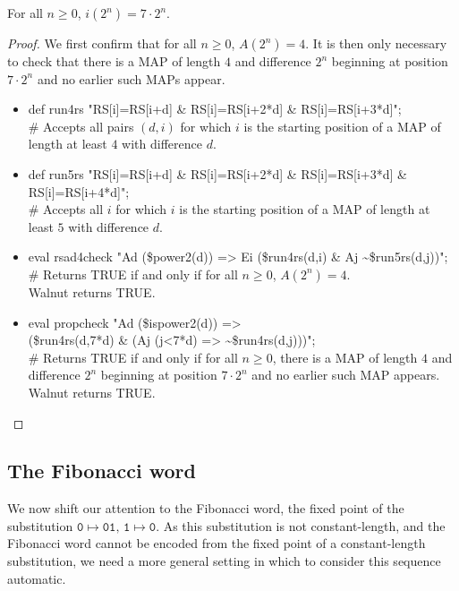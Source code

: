 \documentclass[10pt,a4paper,reqno]{amsart}
\newcommand{\walnut}{{\ttfamily Walnut}}
\newcommand{\true}{{\ttfamily TRUE}}
\begin{document}
\begin{prop}
    For all $n\geq0$, $i(2^n)=7\cdot 2^n$.
\end{prop}
\begin{proof}
We first confirm that for all $n \geq 0$, $A(2^n)=4$. It is then only necessary to check that there is a MAP of length $4$ and difference $2^n$ beginning at position $7\cdot 2^n$ and no earlier such MAPs appear.
\begin{itemize}
   \item {\ttfamily def run4rs "RS[i]=RS[i+d] \& RS[i]=RS[i+2*d] \& RS[i]=RS[i+3*d]";\\\# Accepts all pairs $(d,i)$ for which $i$ is the starting position of a MAP of\\ length at least $4$ with difference $d$.}
   \item {\ttfamily def run5rs "RS[i]=RS[i+d] \& RS[i]=RS[i+2*d] \& RS[i]=RS[i+3*d] \&\\ RS[i]=RS[i+4*d]";\\\# Accepts all $i$ for which $i$ is the starting position of a MAP of length at\\ least $5$ with difference $d$.}
   \item {\ttfamily eval rsad4check "Ad (\$power2(d)) => Ei (\$run4rs(d,i) \& Aj \textasciitilde\$run5rs(d,j))";\\\# Returns \true{} if and only if for all $n\geq 0$, $A(2^n)=4$.\\ \walnut{} returns \true{}.}
   \item {\ttfamily eval propcheck "Ad (\$ispower2(d)) => \\(\$run4rs(d,7*d) \& (Aj (j<7*d) => \textasciitilde\$run4rs(d,j)))";\\\# Returns \true{} if and only if for all $n \geq 0$, there is a MAP of length $4$ and\\ difference $2^n$ beginning at position $7\cdot 2^n$ and no earlier such MAP appears.\\ \walnut{} returns \true. }
\end{itemize}
\end{proof}
\subsection{The Fibonacci word}
We now shift our attention to the Fibonacci word, the fixed point of the substitution $\mathtt{0}\mapsto \mathtt{01},\, \mathtt{1}\mapsto \mathtt{0}$. As this substitution is not constant-length, and the Fibonacci word cannot be encoded from the fixed point of a constant-length substitution, we need a more general setting in which to consider this sequence automatic.
\end{document}
